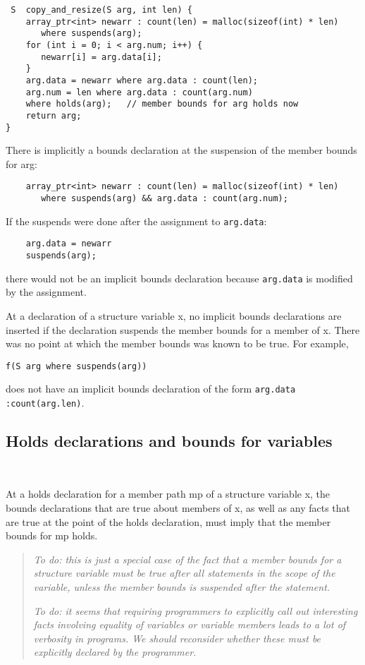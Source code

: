 \begin{verbatim}
 S  copy_and_resize(S arg, int len) {
    array_ptr<int> newarr : count(len) = malloc(sizeof(int) * len)
       where suspends(arg);
    for (int i = 0; i < arg.num; i++) {
       newarr[i] = arg.data[i];
    }
    arg.data = newarr where arg.data : count(len);
    arg.num = len where arg.data : count(arg.num)
    where holds(arg);   // member bounds for arg holds now
    return arg;
}
\end{verbatim}


There is implicitly a bounds declaration at the suspension of the member
bounds for arg:

\begin{verbatim}
    array_ptr<int> newarr : count(len) = malloc(sizeof(int) * len)
       where suspends(arg) && arg.data : count(arg.num);
\end{verbatim}

If the suspends were done after the assignment to \texttt{arg.data}:

\begin{verbatim}
    arg.data = newarr
    suspends(arg);
\end{verbatim}

there would not be an implicit bounds declaration because \texttt{arg.data} is
modified by the assignment.

At a declaration of a structure variable x, no implicit bounds
declarations are inserted if the declaration suspends the member bounds
for a member of x. There was no point at which the member bounds was
known to be true. For example,

\begin{verbatim}
f(S arg where suspends(arg))
\end{verbatim}

does not have an implicit bounds declaration of the form \verb|arg.data :count(arg.len)|.

\subsection{Holds declarations and bounds for variables}\

At a holds declaration for a member path mp of a structure variable x,
the bounds declarations that are true about members of x, as well as any
facts that are true at the point of the holds declaration, must imply
that the member bounds for mp holds.

\begin{quote}
\emph{To do: this is just a special case of the fact that a member
bounds for a structure variable must be true after all statements in the
scope of the variable, unless the member bounds is suspended after the
statement. }

\emph{To do: it seems that requiring programmers to explicitly call out
interesting facts involving equality of variables or variable members
leads to a lot of verbosity in programs. We should reconsider whether
these must be explicitly declared by the programmer.}
\end{quote}

